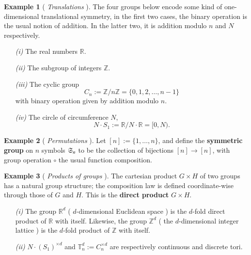 \documentclass[12pt]{article}
\numberwithin{equation}{section}
\theoremstyle{definition}
\newtheorem{eg}{Example}
\newcommand{		\B		}	{\textbf					} %
\newcommand{		\1		}	{	\bm{1}					}%
\begin{document}
\vspace{5mm}
\begin{mdframed}
\begin{eg} [ \emph{Translations} ] The four groups below encode some kind of one-dimensional translational symmetry, in the first two cases, the binary operation is the usual notion of addition. In the latter two, it is addition modulo $n$ and $N$ respectively. 

\begin{itemize}
\item[ \emph{(i)}] The real numbers $\mathbb{R}$.
\item[ \emph{(ii)} ] The subgroup of integers $\mathbb{Z}$.
\item[ \emph{(iii)} ] The cyclic group 
$$
C_n := \mathbb{Z} / n \mathbb{Z} = \{ 0,1, 2, \dots ,n-1\}
$$
with binary operation given by addition modulo $n$. 
\item[ \emph{(iv)} ] The circle of circumference $N$,
$$
N \cdot S_1 := \mathbb{R} / N \cdot \mathbb{R} = [0,N) .
$$
\end{itemize}
\end{eg}
\end{mdframed}

\vspace{5mm}

\begin{mdframed}
\begin{eg}[ \emph{Permutations} ]  Let $[n] := \{1, \dots, n\}$, and define the \B{symmetric group} on $n$ symbols $\frak{S}_n$ to be the collection of bijections $[n] \to [n]$, with group operation $\circ$ the usual function composition. 
\end{eg}
\end{mdframed}
\vspace{5mm}

\begin{mdframed}
\begin{eg}[ \emph{Products of groups} ] 
The cartesian product $G \times H$ of two groups has a natural group structure; the composition law is defined coordinate-wise through those of $G$ and $H$. This is the \B{direct product} $G\times H$. 

\begin{itemize}
\item[ \emph{(i)} ] The group $\mathbb{R}^d$ ( $d$-dimensional Euclidean space ) is the $d$-fold direct product of $\mathbb{R}$ with itself. Likewise, the group $\mathbb{Z}^d$ ( the $d$-dimensional integer lattice ) is the $d$-fold product of $\mathbb{Z}$ with itself. 
\item[ \emph{(ii)} ] $N \cdot (S_1)^{\times d}$ and $\mathbb{T}_n^d := C_n^{\times d}$ are respectively continuous and discrete tori. 
\end{itemize}


\end{eg}
\end{mdframed}
\end{document}
